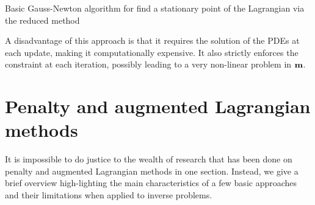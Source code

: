 \documentclass{iopart}
\begin{document}
\begin{algorithm}
\caption{Basic Gauss-Newton algorithm for find a stationary point of the Lagrangian via the reduced method}
\label{alg:reduced}
\begin{algorithmic}
\vspace{1mm}
\vspace{1mm}
\vspace{1mm}
\vspace{2mm}
\vspace{1mm}
\STATE{determine steplength $\alpha^k \in (0,1]$}
\vspace{1mm}
\vspace{1mm}
\vspace{2mm}
\vspace{1mm}
\ENDWHILE
\end{algorithmic}
\end{algorithm}

A disadvantage of this approach is that it requires the solution of the PDEs at each update, making it computationally expensive.  It also strictly enforces the constraint at each iteration, possibly leading to a very non-linear problem in $\mathbf{m}$. 

\section{Penalty and augmented Lagrangian methods}
\label{penalty}
It is impossible to do justice to the wealth of research that has been done on penalty and augmented Lagrangian methods in one section. Instead, we give a brief overview high-lighting the main characteristics of a few basic approaches and their limitations when applied to inverse problems. 
\end{document}
